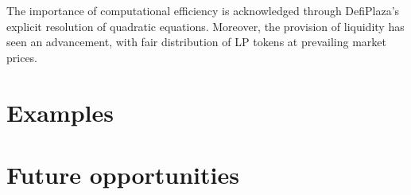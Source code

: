 \documentclass [10pt, twoside] {article}
\begin{document}
The importance of computational efficiency is acknowledged through DefiPlaza’s explicit resolution of quadratic equations. Moreover, the provision of liquidity has seen an advancement, with fair distribution of LP tokens at prevailing market prices.
\section{Examples}

\section{Future opportunities}




%
%
%
%
%


{}
\end{document}
